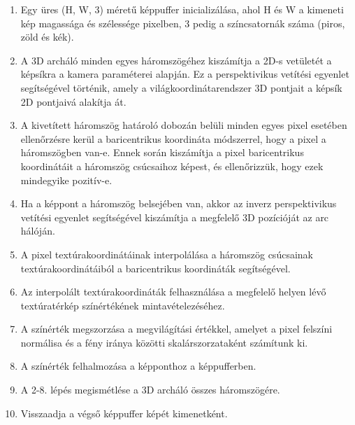 \documentclass[12pt,a4]{article}
\begin{document}
             \begin{enumerate}
             
                \item Egy üres (H, W, 3) méretű képpuffer inicializálása, ahol H és W a kimeneti kép magassága és szélessége pixelben, 3 pedig a színcsatornák száma (piros, zöld és kék).
            
                \item A 3D archáló minden egyes háromszögéhez kiszámítja a 2D-s vetületét a képsíkra a kamera paraméterei alapján. Ez a perspektivikus vetítési egyenlet segítségével történik, 
                amely a világkoordinátarendszer 3D pontjait a képsík 2D pontjaivá alakítja át.
            
                \item A kivetített háromszög határoló dobozán belüli minden egyes pixel esetében ellenőrzésre kerül a baricentrikus koordináta módszerrel, hogy a pixel a háromszögben van-e. 
                Ennek során kiszámítja a pixel baricentrikus koordinátáit a háromszög csúcsaihoz képest, és ellenőrizzük, hogy ezek mindegyike pozitív-e.
             
                \item Ha a képpont a háromszög belsejében van, akkor az inverz perspektivikus vetítési egyenlet segítségével kiszámítja a megfelelő 3D pozícióját az arc hálóján.
            
                \item A pixel textúrakoordinátáinak interpolálása a háromszög csúcsainak textúrakoordinátáiból a baricentrikus koordináták segítségével.
            
                \item Az interpolált textúrakoordináták felhasználása a megfelelő helyen lévő textúratérkép színértékének mintavételezéséhez.
            
                \item A színérték megszorzása a megvilágítási értékkel, amelyet a pixel felszíni normálisa és a fény iránya közötti skalárszorzataként számítunk ki.
            
                \item A színérték felhalmozása a képponthoz a képpufferben.
            
                \item A 2-8. lépés megismétlése a 3D archáló összes háromszögére.
            
                \item Visszaadja a végső képpuffer képét kimenetként.
                
             \end{enumerate}
            
\end{document}
